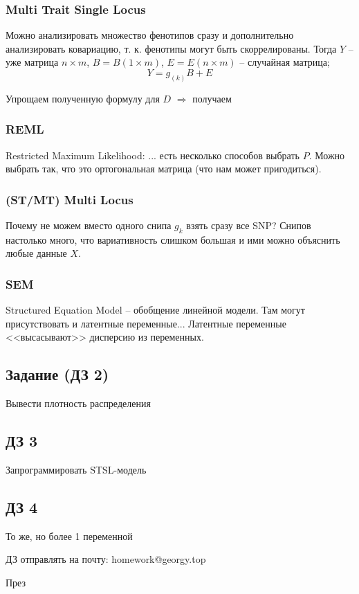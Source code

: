 \documentclass[main.tex]{subfiles}
\begin{document}
\subsubsection{ Multi Trait Single Locus }

Можно анализировать множество фенотипов сразу и дополнительно анализировать ковариацию, т. к. фенотипы могут быть скоррелированы.
Тогда $ Y $ -- уже матрица $ n \times m $, $ B = B(1 \times m) $, $ E = E(n\times m) $ -- случайная матрица;
\[ Y = g_{(k)}B + E \]


Упрощаем полученную формулу для $ D $ $ \Rightarrow $ получаем 


\subsubsection{ REML }

Restricted Maximum Likelihood: ... %
есть несколько способов выбрать $ P $.
Можно выбрать так, что это ортогональная матрица (что нам может пригодиться).

\subsubsection{ (ST/MT) Multi Locus }

Почему не можем вместо одного снипа $ g_{k} $ взять сразу все SNP?
Снипов настолько много, что вариативность слишком большая и ими можно объяснить любые данные $ X $.

\subsubsection{ SEM }

Structured Equation Model -- обобщение линейной модели.
Там могут присутствовать и латентные переменные...
Латентные переменные <<высасывают>> дисперсию из переменных.

\subsection{ Задание (ДЗ 2) }

Вывести плотность распределения

\subsection{ ДЗ 3 }

Запрограммировать STSL-модель

\subsection{ ДЗ 4 }

То же, но более 1 переменной

ДЗ отправлять на почту: homework@georgy.top

През

\textbf{ }
\end{document}
